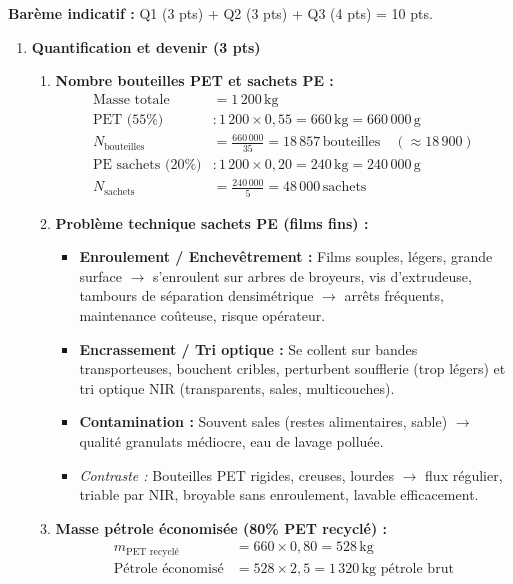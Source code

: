 \documentclass[11pt]{article}
\begin{document}
\begin{corrige}
\textbf{Barème indicatif :} Q1 (3 pts) + Q2 (3 pts) + Q3 (4 pts) = 10 pts.

\begin{enumerate}
    \item \textbf{Quantification et devenir (3 pts)}
    \begin{enumerate}
        \item \textbf{Nombre bouteilles PET et sachets PE :}
        \begin{align*}
            \text{Masse totale} &= 1\,200\,\text{kg} \\
            \text{PET (55\%)} &: 1\,200 \times 0,55 = 660\,\text{kg} = 660\,000\,\text{g} \\
            N_{\text{bouteilles}} &= \frac{660\,000}{35} = \boxed{18\,857\,\text{bouteilles}} \quad (\approx 18\,900) \\
            \text{PE sachets (20\%)} &: 1\,200 \times 0,20 = 240\,\text{kg} = 240\,000\,\text{g} \\
            N_{\text{sachets}} &= \frac{240\,000}{5} = \boxed{48\,000\,\text{sachets}}
        \end{align*}
        \item \textbf{Problème technique sachets PE (films fins) :}
        \begin{itemize}
            \item \textbf{Enroulement / Enchevêtrement :} Films souples, légers, grande surface $\rightarrow$ s'enroulent sur arbres de broyeurs, vis d'extrudeuse, tambours de séparation densimétrique $\rightarrow$ arrêts fréquents, maintenance coûteuse, risque opérateur.
            \item \textbf{Encrassement / Tri optique :} Se collent sur bandes transporteuses, bouchent cribles, perturbent soufflerie (trop légers) et tri optique NIR (transparents, sales, multicouches).
            \item \textbf{Contamination :} Souvent sales (restes alimentaires, sable) $\rightarrow$ qualité granulats médiocre, eau de lavage polluée.
            \item \textit{Contraste :} Bouteilles PET rigides, creuses, lourdes $\rightarrow$ flux régulier, triable par NIR, broyable sans enroulement, lavable efficacement.
        \end{itemize}
        \item \textbf{Masse pétrole économisée (80\% PET recyclé) :}
        \begin{align*}
            m_{\text{PET recyclé}} &= 660 \times 0,80 = 528\,\text{kg} \\
            \text{Pétrole économisé} &= 528 \times 2,5 = \boxed{1\,320\,\text{kg pétrole brut}}
        \end{align*}
    \end{enumerate}


\end{enumerate}
\end{corrige}
\end{document}
